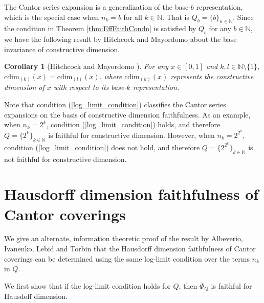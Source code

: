 \documentclass[11pt]{article}
\newtheorem{corollary}{Corollary}
\newcommand{\N}{\mathbb{N}}
\newcommand{\cdim}{\mathrm{cdim}}
\newcommand{\x}{x}
\begin{document}
The Cantor series expansion is a generalization of the
base-$b$ representation, which is the special case when $n_k = b$ for
all $k \in \N$. That is $Q_b = \{b\}_{n\in\N}$. Since the condition in
Theorem \ref{thm:EffFaithCondn} is satisfied by $Q_b$ for any $b \in
\N$, we have the following result by Hitchcock and Mayordomo about the
base invariance of constructive dimension. 

\begin{corollary}[Hitchcock and Mayordomo \cite{HitchMayor13}]
	For any $\x \in [0,1]$ and $k,l \in \N \setminus \{1\}$,
	$\cdim_{(k)}(\x) = \cdim_{(l)}(\x).$ where $\cdim_{(k)}(\x)$
	represents the constructive dimension of $\x$ with respect to
	its base-$k$ representation.
\end{corollary} 


Note that condition (\ref{log_limit_condition}) classifies the Cantor series expansions on the basis of constructive dimension faithfulness. As an example, when $n_k = {2^k}$, condition (\ref{log_limit_condition}) holds, and therefore $Q = \{2^k\}_{k \in \N}$ is faithful for constructive dimension. However,  when $n_k = {2^{2^k}}$,  condition (\ref{log_limit_condition}) does not hold, and therefore $Q = \{2^{2^k}\}_{k \in \N}$ is not faithful for constructive dimension.

\section{Hausdorff dimension faithfulness of Cantor coverings}\label{sec:HausdFaith}

We give an alternate, information theoretic proof of the result by Albeverio, Ivanenko, Lebid and Torbin \cite{Albeverio2020} that the Hausdorff dimension faithfulness of Cantor coverings can be determined using the same log-limit condition over the terms $n_k$ in $Q$.

We first show that if the log-limit condition holds for $Q$, then $\Phi_Q$ is faithful for Hausdoff dimension.
\end{document}
